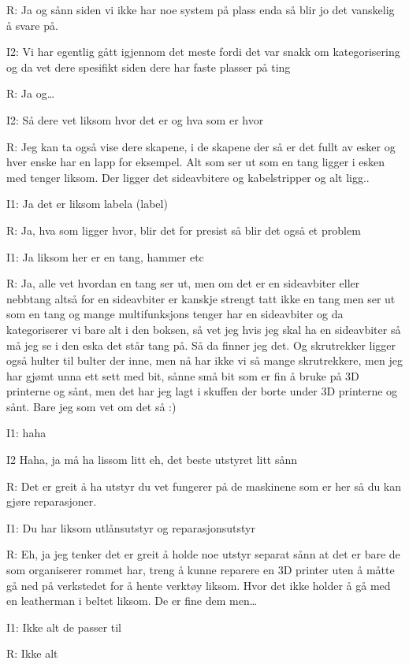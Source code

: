 R: Ja og sånn siden vi ikke har noe system på plass enda så blir jo det vanskelig å svare på. 

I2: Vi har egentlig gått igjennom det meste fordi det var snakk om kategorisering og da vet dere spesifikt siden dere har faste plasser på ting

R: Ja og…

I2: Så dere vet liksom hvor det er og hva som er hvor 

R: Jeg kan ta også vise dere skapene, i de skapene der så er det fullt av  esker   og hver enske har en lapp for eksempel. Alt som ser ut som en tang ligger i esken med tenger liksom. Der ligger det sideavbitere og  kabelstripper og alt ligg..

I1: Ja det er liksom labela (label)

R: Ja, hva som ligger hvor, blir det for presist så blir det også et problem 

I1: Ja liksom her er en tang, hammer etc 

R: Ja, alle vet hvordan en tang ser ut, men om det er en sideavbiter eller nebbtang altså for en sideavbiter  er kanskje strengt tatt ikke en tang  men ser ut som en tang og mange multifunksjons tenger har en sideavbiter og da kategoriserer vi bare alt i den boksen, så vet jeg hvis jeg skal ha en sideavbiter så må jeg se i den eska det står tang på. Så da finner jeg det. Og skrutrekker ligger også hulter til bulter der inne, men nå har ikke vi så mange skrutrekkere, men jeg har gjømt unna ett sett med  bit, sånne små bit som er fin å bruke på 3D printerne og sånt, men det har jeg lagt i skuffen der borte under 3D printerne og sånt. Bare jeg som vet om det så :)  

I1: haha

I2 Haha, ja må  ha lissom  litt eh, det beste utstyret litt sånn

R: Det er greit å ha utstyr du vet fungerer på de maskinene som er her så du kan gjøre reparasjoner.

I1: Du har liksom utlånsutstyr og reparasjonsutstyr    

R: Eh, ja jeg tenker det er greit å holde noe utstyr separat sånn at det er bare de som organiserer rommet har, treng å  kunne reparere en 3D printer uten å måtte gå ned på verkstedet  for å hente verktøy liksom. Hvor det ikke holder å gå med en leatherman i beltet liksom. De er fine dem men…

I1: Ikke alt de passer til

R: Ikke alt      

